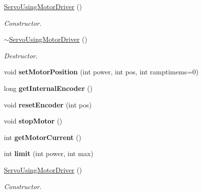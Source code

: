 \begin{DoxyCompactItemize}
\hyperlink{classServoUsingMotorDriver_acc8ccf92143efa853b83940d2d690817}{Servo\+Using\+Motor\+Driver} ()
\begin{DoxyCompactList}\small\item\em Constructor. \end{DoxyCompactList}\item 
\mbox{\label{classServoUsingMotorDriver_a8aa604a17555514d3ddf78e15f467faf}} 
\hyperlink{classServoUsingMotorDriver_a8aa604a17555514d3ddf78e15f467faf}{$\sim$\+Servo\+Using\+Motor\+Driver} ()
\begin{DoxyCompactList}\small\item\em Destructor. \end{DoxyCompactList}\item 
\mbox{\label{classServoUsingMotorDriver_a29f865e4800db3a112e598337eba704c}} 
void {\bfseries set\+Motor\+Position} (int power, int pos, int ramptimems=0)
\item 
\mbox{\label{classServoUsingMotorDriver_a64c62fd0ecb287fe45770c387e394eac}} 
long {\bfseries get\+Internal\+Encoder} ()
\item 
\mbox{\label{classServoUsingMotorDriver_acf78dbe83df0a7744fd40920a6388efd}} 
void {\bfseries reset\+Encoder} (int pos)
\item 
\mbox{\label{classServoUsingMotorDriver_a58fbf805d7bb382b505ea634e6bcbb08}} 
void {\bfseries stop\+Motor} ()
\item 
\mbox{\label{classServoUsingMotorDriver_ad76b35929d55c4249c5e7c3818c053b6}} 
int {\bfseries get\+Motor\+Current} ()
\item 
\mbox{\label{classServoUsingMotorDriver_ae55b5b62a1c2a4cb2d9019528ba5f6cd}} 
int {\bfseries limit} (int power, int max)
\item 
\mbox{\label{classServoUsingMotorDriver_acc8ccf92143efa853b83940d2d690817}} 
\hyperlink{classServoUsingMotorDriver_acc8ccf92143efa853b83940d2d690817}{Servo\+Using\+Motor\+Driver} ()
\begin{DoxyCompactList}\small\item\em Constructor. \end{DoxyCompactList}\item 

\end{DoxyCompactItemize}
